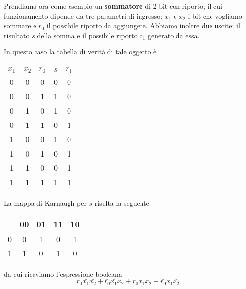 Prendiamo ora come esempio un \textbf{sommatore} di 2 bit con riporto, il cui funzionamento dipende
da tre parametri di ingresso: $x_1$ e $x_2$ i bit che vogliamo sommare e $r_0$ il possibile riporto
da aggiungere. Abbiamo inoltre due uscite: il risultato $s$ della somma e il possibile riporto $r_1$
generato da essa.
\begin{center}
\end{center}
In questo caso la tabella di verità di tale oggetto è
\begin{center}
	\begin{tabular}{c c c | c | c }
		$x_1$ & $x_2$ & $r_0$ & $s$ & $r_1$ \\ \hline
		0     & 0     & 0     & 0   & 0     \\
		0     & 0     & 1     & 1   & 0     \\
		0     & 1     & 0     & 1   & 0     \\
		0     & 1     & 1     & 0   & 1     \\
		1     & 0     & 0     & 1   & 0     \\
		1     & 0     & 1     & 0   & 1     \\
		1     & 1     & 0     & 0   & 1     \\
		1     & 1     & 1     & 1   & 1
	\end{tabular}
\end{center}
La mappa di Karnaugh per $s$ risulta la seguente
\begin{center}
	\begin{tabular}{| c | c | c | c | c |}
		\hline
		\diagbox{$r_0$}{$x_1 x_2$} & 00 & 01 & 11 & 10 \\ \hline
		0                          & 0  & 1  & 0  & 1  \\ \hline
		1                          & 1  & 0  & 1  & 0  \\ \hline
	\end{tabular}
\end{center}
da cui ricaviamo l'espressione booleana
\[ r_0 \bar{x_1} \bar{x_2} + \bar{r_0} \bar{x_1} x_2 + r_0 x_1 x_2 + \bar{r_0} x_1 \bar{x_2} \]
